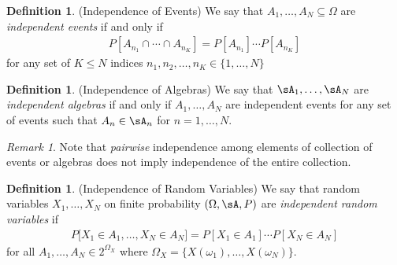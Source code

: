\documentclass[12pt]{article}
\theoremstyle{plain}
\theoremstyle{definition}
\newtheorem{defn}[thm]{Definition}
\theoremstyle{remark}
\newtheorem*{rmk}{Remark}
\begin{document}
\begin{defn}(Independence of Events)
We say that $A_1,\ldots,A_N\subseteq \Omega$ are
\emph{independent events} if and only if
\begin{align*}
  P[A_{n_1}\cap \cdots \cap A_{n_K}] =
  P[A_{n_1}]\cdots P[A_{n_K}]
\end{align*}
for any set of $K\leq N$ indices $n_1,n_2,\ldots,n_K\in\{1,\ldots,N\}$
\end{defn}

\begin{defn}(Independence of Algebras)
We say that $\sA_1,\ldots,\sA_N$ are \emph{independent algebras} if and
only if $A_1,\ldots,A_N$ are independent events for any set of events
such that $A_n\in\sA_n$ for $n=1,\ldots,N$.
\end{defn}

\begin{rmk}
Note that \emph{pairwise} independence among elements of collection of
events or algebras does not imply independence of the entire collection.
\end{rmk}

\begin{defn}(Independence of Random Variables)
We say that random variables $X_1,\ldots,X_N$ on finite probability
$(\Omega,\sA,P)$ are \emph{independent random variables} if
\begin{align*}
  P\big[
    X_1\in A_1,\ldots,X_N\in A_N
  \big]
  =
  P[X_1\in A_1] \cdots P[X_N\in A_N]
\end{align*}
for all $A_1,\ldots,A_N\in 2^{\Omega_X}$ where
$\Omega_X=\{X(\omega_1),\ldots,X(\omega_N)\}$.
\end{defn}






\end{document}
